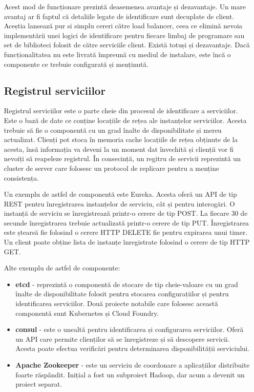 \documentclass[12pt, a4paper, oneside, romanian]{teza-upb}
\begin{document}
Acest mod de funcționare prezintă deasemenea avantaje și dezavantaje. Un mare avantaj ar fi faptul că detaliile legate de identificare sunt decuplate de client. Aceștia lansează pur si simplu cereri către load balancer, ceea ce elimină nevoia implementării unei logici de identificare pentru fiecare limbaj de programare sau set de biblioteci folosit de către serviciile client. Există totuși și dezavantaje. Dacă funcționalitatea nu este livrată împreună cu mediul de instalare, este încă o componente ce trebuie configurată și menținută. 

\subsection{Registrul serviciilor}
Registrul serviciilor este o parte cheie din procesul de identificare a serviciilor. Este o bază de date ce conține locațiile de rețea ale instanțelor serviciilor. Acesta trebuie să fie o componentă cu un grad înalte de disponibilitate și mereu actualizat. Clienți pot stoca în memoria cache locațiile de rețea obținute de la acesta, însă informația va deveni la un moment dat învechită și clienții vor fi nevoiți să reapeleze registrul. În consecință, un regitru de servicii reprezintă un cluster de server care folosesc un protocol de replicare pentru a menține consistența.

Un exemplu de astfel de componentă este Eureka. Acesta oferă un API de tip REST pentru înregistrarea instanțelor de serviciu, cât și pentru interogări. O instanță de serviciu se înregistrează printr-o cerere de tip POST. La fiecare 30 de secunde înregistrarea trebuie actualizată printr-o cerere de tip PUT. Înregistrarea este ștearsă fie folosind o cerere HTTP DELETE fie pentru expirarea unui timer. Un client poate obține lista de instanțe înregistrate folosind o cerere de tip HTTP GET.

Alte exemplu de astfel de componente:

\begin{itemize}
 \item \textbf{etcd} - reprezintă o componentă de stocare de tip cheie-valoare cu un grad înalte de disponibilitate folosit pentru stocarea configurațiilor și pentru identificarea serviciilor. Două proiecte notabile care folosesc această componentă sunt Kubernetes și Cloud Foundry. 
 \item \textbf{consul} - este o unealtă pentru identificarea și configurarea serviciilor. Oferă un API care permite clienților să se înregistreze și să descopere servicii. Acesta poate efectua verificări pentru determinarea disponibilității serviciului. 
 \item \textbf{Apache Zookeeper} - este un serviciu de coordonare a aplicațiilor distribuite foarte răspândit. Inițial a fost un subproiect Hadoop, dar acum a devenit un proiect separat. 
\end{itemize}
\end{document}
